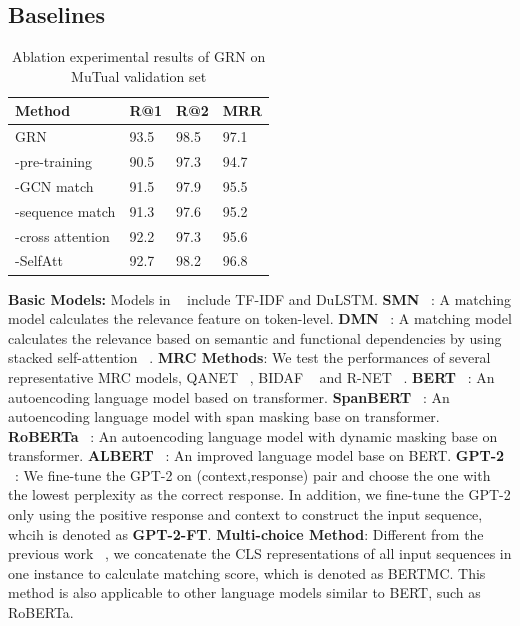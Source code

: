 \documentclass[letterpaper]{article}
\begin{document}
\subsection{Baselines}
\begin{table}[t]
\centering
\begin{tabular}{l|l|l|l}
\hline
   Method & R@1 & R@2 & MRR \\  \hline
    GRN & 93.5 & 98.5 & 97.1 \\
   -pre-training  & 90.5 & 97.3 & 94.7 \\
   -GCN match & 91.5 & 97.9 & 95.5 \\
   -sequence match & 91.3 & 97.6 & 95.2  \\
   -cross attention & 92.2 & 97.3 & 95.6 \\
   -SelfAtt ~\cite{Vaswani2017} & 92.7 & 98.2 & 96.8  \\ \hline

\end{tabular}
\caption{Ablation experimental results of GRN on MuTual validation set}
\label{ablation_result}
\end{table}
\textbf{Basic Models:} Models in ~\cite{2015Lowe} include TF-IDF and DuLSTM. \textbf{SMN} ~\cite{Wu2017}: A matching model calculates the relevance feature on token-level. \textbf{DMN} ~\cite{Zhou2018}: A matching model
calculates the relevance based on semantic and functional dependencies by using stacked self-attention ~\cite{Vaswani2017}. \textbf{MRC Methods}: We test the performances of several representative MRC models, QANET ~\cite{yu2018qanet}, BIDAF ~\cite{seo2017bidirectional} and R-NET ~\cite{wang2017gated}. \textbf{BERT} ~\cite{devlin2018bert}: An autoencoding language model based on transformer.  \textbf{SpanBERT} ~\cite{joshi2020spanbert}: An autoencoding language model with span masking base on transformer. \textbf{RoBERTa} ~\cite{2019RoBERTa}: An autoencoding language model with dynamic masking base on transformer. \textbf{ALBERT} ~\cite{Lan2020}: An improved language model base on BERT. \textbf{GPT-2} ~\cite{Radford2018}: We fine-tune the GPT-2 on (context,response) pair and choose the one with the lowest perplexity as the correct response. In addition, we fine-tune the GPT-2 only using the positive response and context to construct the input sequence, whcih is denoted as \textbf{GPT-2-FT}. \textbf{Multi-choice Method}: Different from the previous work ~\cite{devlin2018bert}, we concatenate the CLS representations of all input sequences in one instance to calculate matching score, which is denoted as BERTMC. This method is also applicable to other language models similar to BERT, such as RoBERTa.
\end{document}
